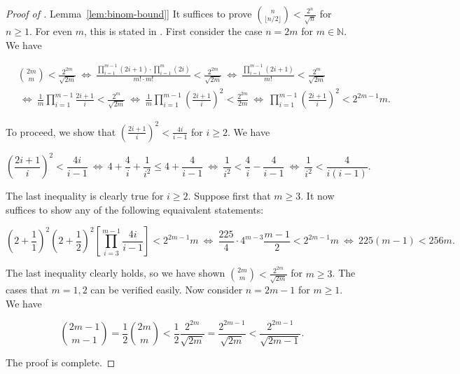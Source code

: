 \documentclass[11pt]{article}
\numberwithin{equation}{section}
\theoremstyle{definition}
\theoremstyle{plain}
\newcommand{\expref}[2]{\hyperref[#2]{#1~\ref{#2}}}
\begin{document}
\begin{proof}[Proof of \expref{Lemma}{lem:binom-bound}]
				It suffices to prove $\binom{n}{\lfloor n/2 \rfloor} < \frac{2^n}{\sqrt{n}}$ for $n \ge 1$.
				For even $m$, this is stated in \cite[2.6.2 Proposition]{invitation}.
				First consider the case $n = 2m$ for $m\in \mathbb{N}$. We have
				\begin{linenomath}\begin{equation*}
						\begin{aligned}
							& \binom{2m}{m} < \frac{2^{2m}}{\sqrt{2m}}
							~\iff~ \frac{\prod_{i=1}^{m-1} (2i + 1) \cdot \prod_{i=1}^m (2i)}{m!\cdot m!} < \frac{2^{2m}}{\sqrt{2m}}
							~\iff~ \frac{\prod_{i=1}^{m-1} (2i + 1)}{m!} < \frac{2^m}{\sqrt{2m}} \\
							& ~\iff~ \frac{1}{m} \prod_{i=1}^{m-1} \frac{2i + 1}{i} < \frac{2^m}{\sqrt{2m}}
							~\iff~ \frac{1}{m}\prod_{i=1}^{m-1} \left(\frac{2i + 1}{i}\right)^2 < \frac{2^{2m}}{2m}
							~\iff~ \prod_{i=1}^{m-1} \left(\frac{2i + 1}{i}\right)^2 < 2^{2m - 1}m.
						\end{aligned}
				\end{equation*}\end{linenomath}
				To proceed, we show that $\left(\frac{2i + 1}{i}\right)^2 < \frac{4i}{i - 1}$ for $i \ge 2$.
				We have
				\begin{linenomath}\begin{equation*}
						\left(\frac{2i + 1}{i}\right)^2 < \frac{4i}{i - 1}
						~\iff~ 4 + \frac{4}{i} + \frac{1}{i^2} \le 4 + \frac{4}{i - 1}
						~\iff~ \frac{1}{i^2} < \frac{4}{i} - \frac{4}{i - 1}
						~\iff~ \frac{1}{i^2} < \frac{4}{i(i - 1)}.
				\end{equation*}\end{linenomath}
				The last inequality is clearly true for $i\ge 2$.
				Suppose first that $m \ge 3$.
				It now suffices to show %
				any of the following equaivalent statements:  %
				\begin{linenomath}\begin{equation*}
						\left(2 + \frac{1}{1}\right)^2 \left(2 + \frac{1}{2}\right)^2 \left[\prod_{i=3}^{m-1} \frac{4i}{i - 1}\right] < 2^{2m - 1}m
						~\iff~ \frac{225}{4}\cdot 4^{m-3}\frac{m-1}{2} < 2^{2m - 1}m
						~\iff~ 225(m - 1) < 256m.
				\end{equation*}\end{linenomath}
				The last inequality clearly holds, so we have shown $\binom{2m}{m} < \frac{2^{2m}}{\sqrt{2m}}$ for $m\ge 3$.
				The cases that $m = 1, 2$ can be verified easily.
				Now consider $n = 2m - 1$ for $m \ge 1$.
				We have
				\begin{linenomath}\begin{equation*}
						\binom{2m - 1}{m - 1} = \frac{1}{2} \binom{2m}{m} < \frac{1}{2} \frac{2^{2m}}{\sqrt{2m}}
						= \frac{2^{2m - 1}}{\sqrt{2m}} < \frac{2^{2m - 1}}{\sqrt{2m - 1}}.
				\end{equation*}\end{linenomath}
				The proof is complete.
			\end{proof}
			\fi  %
			
\end{document}
